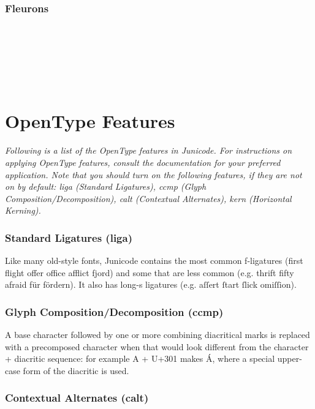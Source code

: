 \documentclass[12pt,a4paper,openany]{book}
\begin{document}
\subsection*{Fleurons}

\begin{center}
\huge    \\
 \\[0.7ex]
\\[0.7ex]
\\
 
\end{center}

\chapter*{\color{myBlue}OpenType Features}

{\itshape Following is a list of the OpenType features in
  Junicode. For instructions on applying OpenType features, consult
  the documentation for your preferred application. Note that you
  should turn on the following features, if they are not on by
  default: {\upshape liga} (Standard Ligatures), {\upshape ccmp}
  (Glyph Composition/Decomposition), {\upshape calt} (Contextual
  Alternates), {\upshape kern} (Horizontal Kerning).}

\subsection*{Standard Ligatures (liga)}

Like many old-style fonts, Junicode contains the most common f-ligatures
(first flight offer office afflict fjord) and some that are less common
(e.g. thrift fifty afraid für fördern).  It
also has long-s ligatures (e.g. aſſert ſtart ſlick omiſſion).

\subsection*{Glyph Composition/Decomposition (ccmp)}

A base character followed by one or more combining diacritical marks
is replaced with a precomposed character when that would look
different from the character + diacritic sequence: for example A +
U+301 makes Á, where a special upper-case form of the diacritic is
used.

\subsection*{Contextual Alternates (calt)}
\end{document}
